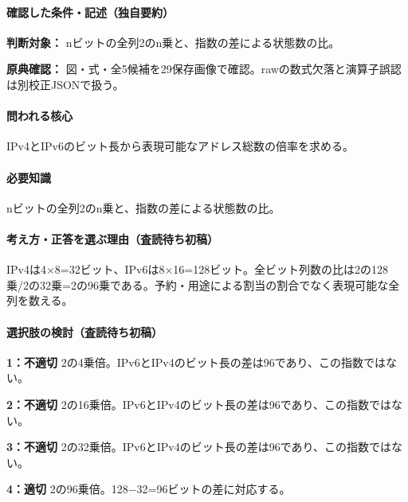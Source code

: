 \paragraph{確認した条件・記述（独自要約）}\mbox{}\par

\noindent\textbf{判断対象：} nビットの全列2のn乗と、指数の差による状態数の比。\par

\noindent\textbf{原典確認：} 図・式・全5候補を29保存画像で確認。rawの数式欠落と演算子誤認は別校正JSONで扱う。\par

\paragraph{問われる核心} IPv4とIPv6のビット長から表現可能なアドレス総数の倍率を求める。

\paragraph{必要知識} nビットの全列2のn乗と、指数の差による状態数の比。

\paragraph{考え方・正答を選ぶ理由（査読待ち初稿）} IPv4は4×8=\allowbreak{}32ビット、IPv6は8×16=\allowbreak{}128ビット。全ビット列数の比は2の128乗/2の32乗=2の96乗である。予約・用途による割当の割合でなく表現可能な全列を数える。

\paragraph{選択肢の検討（査読待ち初稿）}\mbox{}\par

\noindent\textbf{1：不適切} 2の4乗倍。IPv6とIPv4のビット長の差は96であり、この指数ではない。\par

\noindent\textbf{2：不適切} 2の16乗倍。IPv6とIPv4のビット長の差は96であり、この指数ではない。\par

\noindent\textbf{3：不適切} 2の32乗倍。IPv6とIPv4のビット長の差は96であり、この指数ではない。\par

\noindent\textbf{4：適切} 2の96乗倍。128−32=\allowbreak{}96ビットの差に対応する。\par

